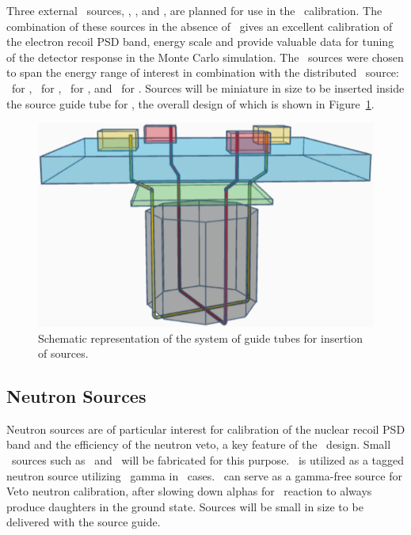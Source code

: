 Three external \gr\ sources, \Co, \Ba, and \Cs, are planned for use in the \TPC\ calibration. The combination of these sources in the absence of \ArThirtyNine\ gives an excellent calibration of the electron recoil PSD band, energy scale and provide valuable data for tuning of the detector response in the Monte Carlo simulation. The \gr\ sources were chosen to span the energy range of interest in combination with the distributed \Kr\ source: \KrEightThreeMOneTwoECEnergy\ for \Kr, \CoEnergy\ for \Co, \BaEnergy\ for \Ba, and \CsEnergy\ for \Cs.  Sources will be miniature in size to be inserted inside the source guide tube for \TPC, the overall design of which is shown in Figure~\ref{fig:Calibration-OverallSystemDesign}.

\begin{figure}[t!]
\includegraphics[width=\textwidth]{./Figures/Calibration-OverallSystemDesign.png}
\caption[Schematic of the sources insertion system]{Schematic representation of the system of guide tubes for insertion of sources.}
\label{fig:Calibration-OverallSystemDesign}
\end{figure}


\subsection{Neutron Sources}

Neutron sources are of particular interest for calibration of the nuclear recoil PSD band and the efficiency of the neutron veto, a key feature of the \DSks\ design.  Small \alphan\ sources such as \AmBe\ and \AmC\ will be fabricated for this purpose. \AmBe\ is utilized as a tagged neutron source utilizing \AmBeGammaEnergy\ gamma in \AmTwoFourOneGammaTwoBR\ cases. \AmC\ can serve as a gamma-free source for Veto neutron calibration, after slowing down alphas for \alphan\ reaction to always produce daughters in the ground state. Sources will be small in size to be delivered with the source guide. 

